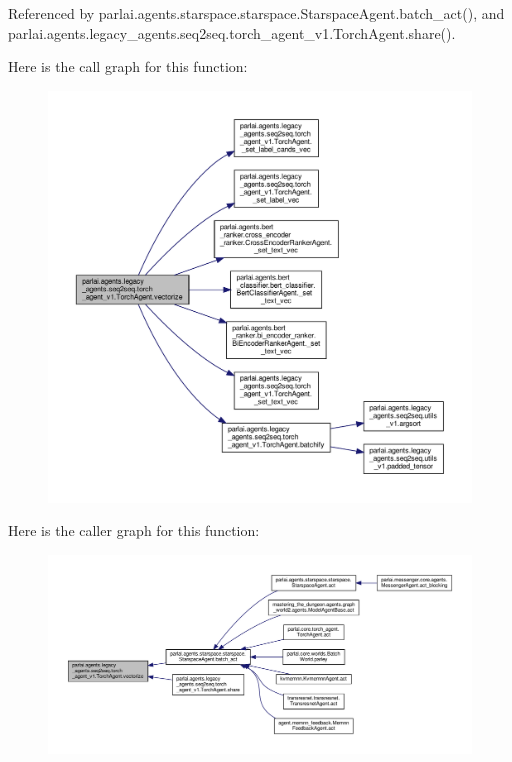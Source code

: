 Referenced by parlai.\+agents.\+starspace.\+starspace.\+Starspace\+Agent.\+batch\+\_\+act(), and parlai.\+agents.\+legacy\+\_\+agents.\+seq2seq.\+torch\+\_\+agent\+\_\+v1.\+Torch\+Agent.\+share().

Here is the call graph for this function\+:
\nopagebreak
\begin{figure}[H]
\begin{center}
\leavevmode
\includegraphics[width=350pt]{classparlai_1_1agents_1_1legacy__agents_1_1seq2seq_1_1torch__agent__v1_1_1TorchAgent_a866838e1c81063a3ec18c5609e029f90_cgraph}
\end{center}
\end{figure}
Here is the caller graph for this function\+:
\nopagebreak
\begin{figure}[H]
\begin{center}
\leavevmode
\includegraphics[width=350pt]{classparlai_1_1agents_1_1legacy__agents_1_1seq2seq_1_1torch__agent__v1_1_1TorchAgent_a866838e1c81063a3ec18c5609e029f90_icgraph}
\end{center}
\end{figure}


